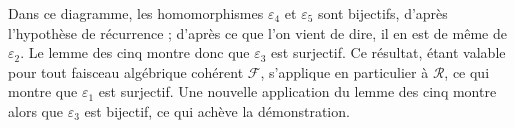\begin{center}
\end{center}
Dans ce diagramme, les homomorphismes $\varepsilon_4$ et $\varepsilon_5$ sont bijectifs, d'après l'hypothèse de récurrence ; d'après ce que l'on vient de dire, il en est de même de $\varepsilon_2$. Le lemme des cinq montre donc que $\varepsilon_3$ est surjectif. Ce résultat, étant valable pour tout faisceau algébrique cohérent $\mathcal{F}$, s'applique en particulier à $\mathcal{R}$, ce qui montre que $\varepsilon_1$ est surjectif. Une nouvelle application du lemme des cinq montre alors que $\varepsilon_3$ est bijectif, ce qui achève la démonstration.


